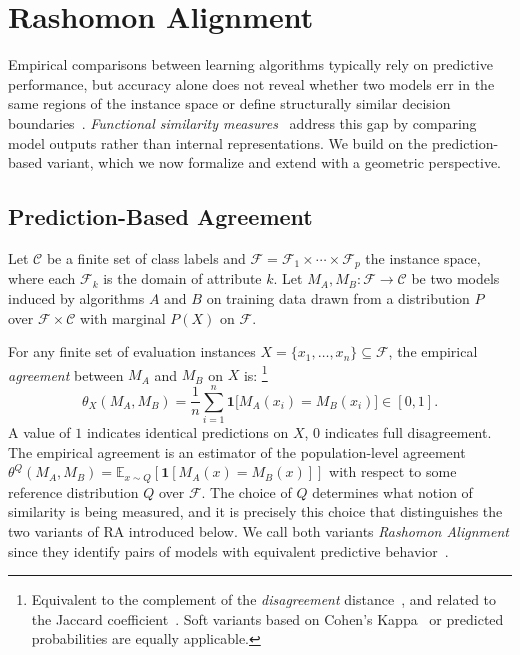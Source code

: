 \documentclass[runningheads]{llncs}
\begin{document}
\section{Rashomon Alignment}
\label{sec:align}

Empirical comparisons between learning algorithms typically rely on predictive performance, but accuracy alone does not reveal whether two models err in the same regions of the instance space or define structurally similar decision boundaries~\cite{Fernandez-Delgado2014a,d2022}. \emph{Functional similarity measures}~\cite{Klabunde2025} address this gap by comparing model outputs rather than internal representations. We build on the prediction-based variant, which we now formalize and extend with a geometric perspective.

\subsection{Prediction-Based Agreement}
\label{sec:agreement}

Let $\mathcal{C}$ be a finite set of class labels and $\mathcal{F} = \mathcal{F}_1 \times \cdots \times \mathcal{F}_p$ the instance space, where each $\mathcal{F}_k$ is the domain of attribute $k$. Let $M_A, M_B : \mathcal{F} \to \mathcal{C}$ be two models induced by algorithms $A$ and $B$ on training data drawn from a distribution $P$ over $\mathcal{F} \times \mathcal{C}$ with marginal $P(X)$ on $\mathcal{F}$.

For any finite set of evaluation instances $X = \{x_1, \ldots, x_n\} \subseteq \mathcal{F}$, the empirical \emph{agreement} between $M_A$ and $M_B$ on $X$ is:%
\footnote{Equivalent to the complement of the \emph{disagreement} distance~\cite{Lee2011}, and related to the Jaccard coefficient~\cite{jaccard1901}. Soft variants based on Cohen's Kappa~\cite{cohen1960} or predicted probabilities are equally applicable.}
\begin{equation}
  \label{eq:agreement}
  \theta_X(M_A, M_B) = \frac{1}{n} \sum_{i=1}^{n} \mathbf{1}\bigl[M_A(x_i) = M_B(x_i)\bigr] \in [0, 1].
\end{equation}
A value of $1$ indicates identical predictions on $X$, $0$ indicates full disagreement. The empirical agreement is an estimator of the population-level agreement $\theta^Q(M_A, M_B) = \mathbb{E}_{x \sim Q}[\mathbf{1}[M_A(x) = M_B(x)]]$ with respect to some reference distribution $Q$ over $\mathcal{F}$. The choice of $Q$ determines what notion of similarity is being measured, and it is precisely this choice that distinguishes the two variants of RA introduced below. We call both variants \emph{Rashomon Alignment} since they identify pairs of models with equivalent predictive behavior~\cite{d2022,Breiman2001}.
\end{document}

